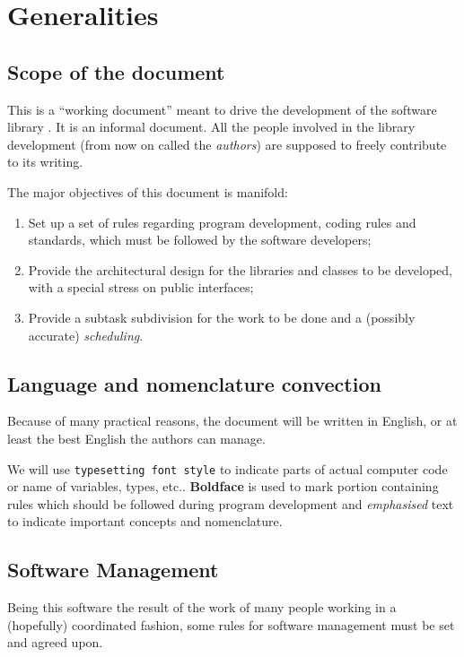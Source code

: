 
\chapter{Generalities}
\label{cha:generalities}

\section{Scope of the document}
\label{sec:scope-document}

This is a ``working document'' meant to drive the development of the
software library \thelibrary. It is an informal document. All the
people involved in the library development (from now on called the
\emph{authors}) are supposed to freely contribute to its writing.

The major objectives of this document is manifold:
\begin{enumerate}
\item Set up a set of rules regarding program development, coding rules
  and standards, which must be followed by the software developers;
\item Provide the architectural design for the libraries and classes
  to be developed, with a special stress on public interfaces;
\item Provide a subtask subdivision for the work to be done and a
  (possibly accurate) \emph{scheduling}.
\end{enumerate}

\section{Language and nomenclature convection} 
\label{sec:lang-nomencl-conv}

Because of many practical reasons, the document will be written in
English, or at least the best English the authors can manage.

We will use \texttt{typesetting font style} to indicate parts of
actual computer code or name of variables, types, etc..
\textbf{Boldface} is used to mark portion containing rules which
should be followed during program development and \emph{emphasised}
text to indicate important concepts and nomenclature.
 
\section{Software Management} 
\label{sec:software-management}

Being this software the result of the work of many people working in a
(hopefully) coordinated fashion, some rules for software management
must be set and agreed upon.

